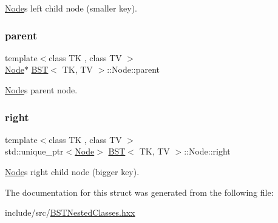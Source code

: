 \hyperlink{structBST_1_1Node}{Node}\textquotesingle{}s left child node (smaller key). \mbox{\label{structBST_1_1Node_a645580e661f788dc0f0ad62271b26710}} 
\subsubsection{\texorpdfstring{parent}{parent}}
{\footnotesize\ttfamily template$<$class TK , class TV $>$ \\
\hyperlink{structBST_1_1Node}{Node}$\ast$ \hyperlink{classBST}{B\+ST}$<$ TK, TV $>$\+::Node\+::parent}

\hyperlink{structBST_1_1Node}{Node}\textquotesingle{}s parent node. \mbox{\label{structBST_1_1Node_ac470075bea90a9c6bf396ca24b557908}} 
\subsubsection{\texorpdfstring{right}{right}}
{\footnotesize\ttfamily template$<$class TK , class TV $>$ \\
std\+::unique\+\_\+ptr$<$\hyperlink{structBST_1_1Node}{Node}$>$ \hyperlink{classBST}{B\+ST}$<$ TK, TV $>$\+::Node\+::right}

\hyperlink{structBST_1_1Node}{Node}\textquotesingle{}s right child node (bigger key). 

The documentation for this struct was generated from the following file\+:\begin{DoxyCompactItemize}
\item 
include/src/\hyperlink{BSTNestedClasses_8hxx}{B\+S\+T\+Nested\+Classes.\+hxx}\end{DoxyCompactItemize}
